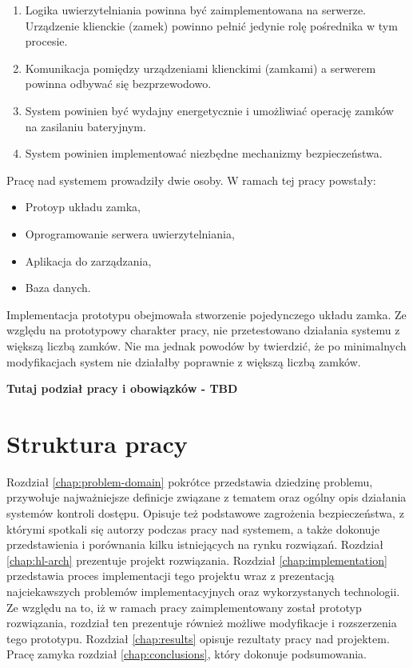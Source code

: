 		\begin{enumerate}
		    \item Logika uwierzytelniania powinna być zaimplementowana na serwerze. Urządzenie klienckie (zamek) powinno pełnić jedynie rolę pośrednika w tym procesie.
		    \item Komunikacja pomiędzy urządzeniami klienckimi (zamkami) a serwerem powinna odbywać się bezprzewodowo.
		    \item System powinien być wydajny energetycznie i umożliwiać operację zamków na zasilaniu bateryjnym.
		    \item System powinien implementować niezbędne mechanizmy bezpieczeństwa.
		\end{enumerate}

		Pracę nad systemem prowadziły dwie osoby. W ramach tej pracy powstały:
		\begin{itemize}
		    \item Protoyp układu zamka,
		    \item Oprogramowanie serwera uwierzytelniania,
		    \item Aplikacja do zarządzania,
		    \item Baza danych.
		\end{itemize}

		Implementacja prototypu obejmowała stworzenie pojedynczego układu zamka. Ze względu na prototypowy charakter pracy, nie przetestowano działania systemu z większą liczbą zamków. Nie ma jednak powodów by twierdzić, że po minimalnych modyfikacjach system nie działałby poprawnie z większą liczbą zamków.

		\textbf{Tutaj podział pracy i obowiązków - TBD}

	\section{Struktura pracy}

		Rozdział \ref{chap:problem-domain} pokrótce przedstawia dziedzinę problemu, przywołuje najważniejsze definicje związane z tematem oraz ogólny opis działania systemów kontroli dostępu. Opisuje też podstawowe zagrożenia bezpieczeństwa, z którymi spotkali się autorzy podczas pracy nad systemem, a także dokonuje przedstawienia i porównania kilku istniejących na rynku rozwiązań. Rozdział \ref{chap:hl-arch} prezentuje projekt rozwiązania. Rozdział \ref{chap:implementation} przedstawia proces implementacji tego projektu wraz z prezentacją najciekawszych problemów implementacyjnych oraz wykorzystanych technologii. Ze względu na to, iż w ramach pracy zaimplementowany został prototyp rozwiązania, rozdział ten prezentuje również możliwe modyfikacje i rozszerzenia tego prototypu. Rozdział \ref{chap:results} opisuje rezultaty pracy nad projektem. Pracę zamyka rozdział \ref{chap:conclusions}, który dokonuje podsumowania.